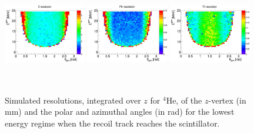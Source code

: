 \begin{figure}[ht!]
    \begin{center}
        \includegraphics[height=4.5cm, width=0.32\textwidth]{./../Detector/fig-chap2/Bare_3atm_1atm_Alpha_ResoZ}
        \includegraphics[height=4.5cm, width=0.32\textwidth]{./../Detector/fig-chap2/Bare_3atm_1atm_Alpha_ResoPhi}
        \includegraphics[height=4.5cm, width=0.32\textwidth]{./../Detector/fig-chap2/Bare_3atm_1atm_Alpha_ResoTh}
        \caption{Simulated resolutions, integrated over $z$ for $^4$He, of the $z$-vertex (in mm) and the polar and azimuthal angles (in rad) for the lowest energy regime when the recoil track reaches the scintillator. \label{fig:tracking}}
    \end{center}
\end{figure}
